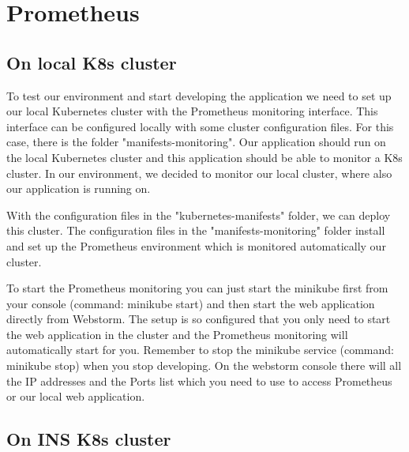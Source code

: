\chapter{Prometheus}

\section{On local K8s cluster}
To test our environment and start developing the application we need to set up our local Kubernetes cluster with the Prometheus monitoring interface. This interface can be configured locally with some cluster configuration files. For this case, there is the folder "manifests-monitoring". Our application should run on the local Kubernetes cluster and this application should be able to monitor a K8s cluster. In our environment, we decided to monitor our local cluster, where also our application is running on.

With the configuration files in the "kubernetes-manifests" folder, we can deploy this cluster. The configuration files in the "manifests-monitoring" folder install and set up the Prometheus environment which is monitored automatically our cluster.

To start the Prometheus monitoring you can just start the minikube first from your console (command: minikube start) and then start the web application directly from Webstorm. The setup is so configured that you only need to start the web application in the cluster and the Prometheus monitoring will automatically start for you. Remember to stop the minikube service (command: minikube stop) when you stop developing. On the webstorm console there will all the IP addresses and the Ports list which you need to use to access Prometheus or our local web application.

\section{On INS K8s cluster}